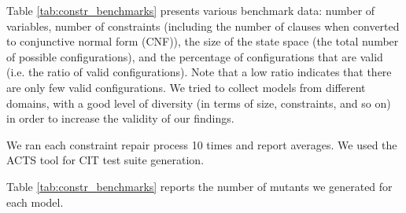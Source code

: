 \begin{tikzborder}{\cite{Gargantini16:validation}}
\begin{tikzborder}{\cite{gargantini_combinatorial_2017}}
\begin{table}[h]
	\caption{The benchmark data {\small (for CNF size $a^b$ means $b$ clauses with $a$ literals each.)}}\label{tab:constr_benchmarks}
	\small \centering
\end{table}

\smallskip

\bb Table \ref{tab:constr_benchmarks} presents various benchmark data: number of variables, number of constraints (including the number of clauses when converted to conjunctive normal form (CNF)), the size of the state space (the total number of possible configurations), and the percentage of configurations that are valid  (i.e. the ratio of valid configurations). Note that a low ratio indicates that there are only few valid configurations. We tried to collect models from different domains, with a good level of diversity (in terms of size, constraints, and so on) in order to increase the validity of our findings.

We ran each constraint repair process 10 times and report averages. We used the ACTS tool for CIT test suite generation.

Table \ref{tab:constr_benchmarks} reports the number of mutants we generated for each model.\be


\end{tikzborder}
\end{tikzborder}
